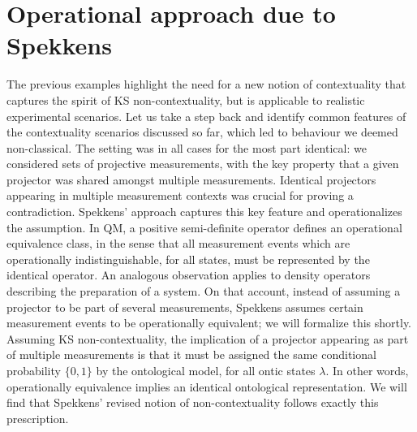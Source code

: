 \section{Operational approach due to Spekkens}
\label{sec:spekkensopappr}
The previous examples highlight the need for a new notion of contextuality that captures the spirit of KS non-contextuality, but is applicable to realistic experimental scenarios. Let us take a step back and identify common features of the contextuality scenarios discussed so far, which led to behaviour we deemed non-classical. The setting was in all cases for the most part identical: we considered sets of projective measurements, with the key property that a given projector was shared amongst multiple measurements. Identical projectors appearing in multiple measurement contexts was crucial for proving a contradiction. Spekkens' approach captures this key feature and operationalizes the assumption. In QM, a positive semi-definite operator defines an operational equivalence class, in the sense that all measurement events which are operationally indistinguishable, for all states, must be represented by the identical operator. An analogous observation applies to density operators describing the preparation of a system.
On that account, instead of assuming a projector to be part of several measurements, Spekkens assumes certain measurement events to be operationally equivalent; we will formalize this shortly. Assuming KS non-contextuality, the implication of a projector appearing as part of multiple measurements is that it must be assigned the same conditional probability $\{0,1\}$ by the ontological model, for all ontic states $\lambda$. In other words, operationally equivalence implies an identical ontological representation. We will find that Spekkens' revised notion of non-contextuality follows exactly this prescription.  

